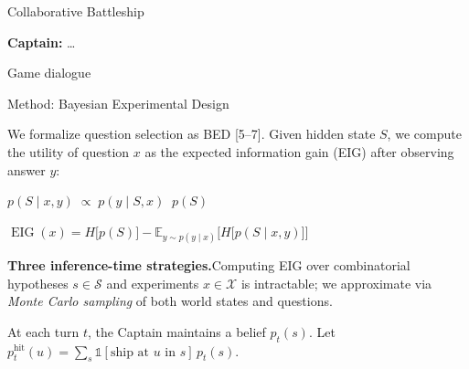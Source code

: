 \documentclass[final]{beamer}
\newlength{\colwidth}
\begin{document}
\begin{frame}[t,fragile]
\begin{columns}[t]
\begin{column}{\colwidth}
\begin{block}{Collaborative Battleship}
\begin{minipage}[b]{0.43\colwidth}
\begin{tcolorbox}
\begin{minipage}[t][\dimexpr\boardht-19pt\relax][t]{\dimexpr\linewidth\relax}
  \vfill
  \begin{captainbubble}[remember as=lastbubble]
  \captainavatar\;\textbf{Captain:} \ldots
  \end{captainbubble}
  \end{minipage}
  \end{tcolorbox}
  \begin{center}{\small\textcolor{BattleshipGray}{Game dialogue}}\end{center}
\end{minipage}

\end{block}

\begin{block}{Method: Bayesian Experimental Design}

We formalize question selection as BED [5--7]. Given hidden state $S$, we compute the utility of question $x$ as the expected information gain (EIG) after observing answer $y$:
%
\begin{center}
\begin{minipage}[c]{0.38\colwidth}
\centering
$\displaystyle p(S \mid x, y) \;\propto\; p(y \mid S, x) \;\; p(S)$
\end{minipage}\hfill
\begin{minipage}[c]{0.58\colwidth}
\colorbox{AirBlue!15}{\;\;$\displaystyle\operatorname{EIG}(x) = H\big[p(S)\big] - \mathbb{E}_{y \sim p(y \mid x)}\!\Big[H\big[p(S \mid x, y)\big]\Big]$\;\;}
\end{minipage}
\end{center}

{\bfseries\textcolor{HonoluluBlue}{Three inference-time strategies.}}\enspace Computing EIG over combinatorial hypotheses $s \in \mathcal{S}$ and experiments $x \in \mathcal{X}$ is intractable; we approximate via \emph{Monte Carlo sampling} of both world states and questions.

At each turn $t$, the Captain maintains a belief $p_t(s)$. Let $p^{\mathrm{hit}}_t(u) = \sum_{s} \mathds{1}[\text{ship at } u \text{ in } s]\, p_t(s)$.


\end{block}
\end{column}
\end{columns}
\end{frame}
\end{document}
